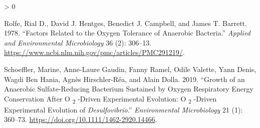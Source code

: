 \documentclass{article}
\newlength{\cslhangindent}
\newenvironment{CSLReferences}[2] %
 {%
  \setlength{\parindent}{0pt}
  \ifodd #1 \everypar{\setlength{\hangindent}{\cslhangindent}}\ignorespaces\fi
  \ifnum #2 > 0
  \setlength{\parskip}{#2\baselineskip}
  \fi
 }%
 {}
\begin{document}
\begin{CSLReferences}{1}{0}
\leavevmode\hypertarget{ref-rolfe1978}{}%
Rolfe, Rial D., David J. Hentges, Benedict J. Campbell, and James T.
Barrett. 1978. {``Factors Related to the Oxygen Tolerance of Anaerobic
Bacteria.''} \emph{Applied and Environmental Microbiology} 36 (2):
306--13. \url{https://www.ncbi.nlm.nih.gov/pmc/articles/PMC291219/}.

\leavevmode\hypertarget{ref-schoeffler2019}{}%
Schoeffler, Marine, Anne-Laure Gaudin, Fanny Ramel, Odile Valette, Yann
Denis, Wagdi Ben Hania, Agnès Hirschler-Réa, and Alain Dolla. 2019.
{``Growth of an Anaerobic Sulfate-Reducing Bacterium Sustained by Oxygen
Respiratory Energy Conservation After O {\textsubscript{2}} -Driven
Experimental Evolution: O {\textsubscript{2}} -Driven Experimental
Evolution of {\emph{Desulfovibrio}}.''} \emph{Environmental
Microbiology} 21 (1): 360--73.
\url{https://doi.org/10.1111/1462-2920.14466}.

\end{CSLReferences}



\end{document}
